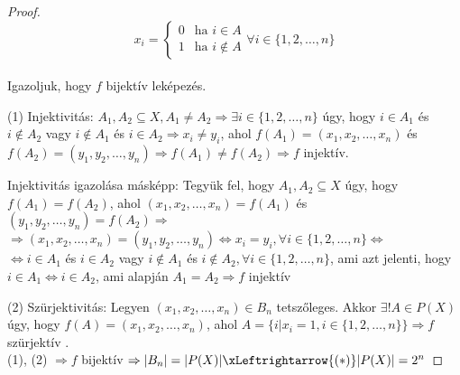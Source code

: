 \begin{proof}
	\[
	x_{i}=\left\{ \begin{array}{ll}
		0 & \text{ha }i\in A\\
		1 & \text{ha }i\not\in A
	\end{array}\right.\forall i\in\{1,2,\ldots,n\}
	\]
	\\
	Igazoljuk, hogy $f$ bijektív leképezés.
	
	(1) Injektivitás: $A_{1},A_{2}\subseteq X,A_{1}\neq A_{2}\Rightarrow\exists i\in\{1,2,\ldots,n\}$
	úgy, hogy $i\in A_{1}$ és $i\not\in A_{2}$ vagy $i\not\in A_{1}$
	és $i\in A_{2}\Rightarrow x_{i}\neq y_{i}$, ahol $f(A_{1})=(x_{1},x_{2},\ldots,x_{n})$
	és $f(A_{2})=(y_{1},y_{2},\ldots,y_{n})\Rightarrow f(A_{1})\neq f(A_{2})\Rightarrow f$
	injektív.
	
	Injektivitás igazolása másképp: Tegyük fel, hogy $A_{1},A_{2}\subseteq X$
	úgy, hogy $f(A_{1})=f(A_{2})$, ahol $(x_{1},x_{2},\ldots,x_{n})=f(A_{1})$
	és $(y_{1},y_{2},\ldots,y_{n})=f(A_{2})\Rightarrow$ \\
	$\Rightarrow(x_{1},x_{2},\ldots,x_{n})=(y_{1},y_{2},\ldots,y_{n})\Leftrightarrow x_{i}=y_{i},\forall i\in\{1,2,\ldots,n\}\Leftrightarrow$
	\\
	$\Leftrightarrow i\in A_{1}$ és $i\in A_{2}$ vagy $i\not\in A_{1}$
	és $i\not\in A_{2},\forall i\in\{1,2,\ldots,n\}$, ami azt jelenti,
	hogy $i\in A_{1}\Leftrightarrow i\in A_{2}$, ami alapján $A_{1}=A_{2}\Rightarrow f$
	injektív
	
	(2) Szürjektivitás: Legyen $(x_{1},x_{2},\ldots,x_{n})\in B_{n}$
	tetszőleges. Akkor $\exists!A\in P(X)$ úgy, hogy $f(A)=(x_{1},x_{2},\ldots,x_{n})$,
	ahol $A=\{i|x_{i}=1,i\in\{1,2,\ldots,n\}\}\Rightarrow f$ szürjektív
	.\\
	(1), (2) $\Rightarrow f$ bijektív $\Rightarrow|B_{n}|=|P(X)|\xLeftrightarrow{(*)}|P(X)|=2^{n}$ 
\end{proof}

